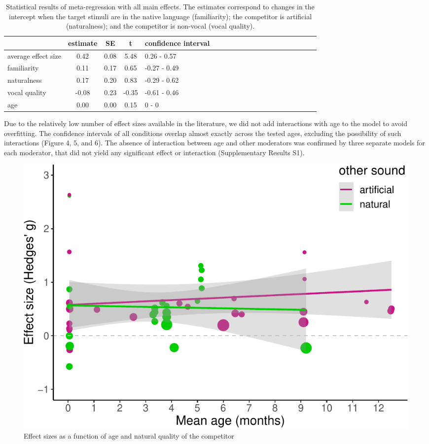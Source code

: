 \documentclass[man]{apa6}
\begin{document}
\begin{table}[tbp]
\begin{center}
\begin{threeparttable}
\caption{\label{tab:Table1}Statistical results of meta-regression with all main effects. The estimates correspond to changes in the intercept when the target stimuli are in the native language (familiarity); the competitor is artificial (naturalness); and the competitor is non-vocal (vocal quality).}
\begin{tabular}{lccclccclccclccclccc}
\toprule
 & estimate & SE & t & confidence interval\\
\midrule
average effect size & 0.42 & 0.08 & 5.48 & 0.26 - 0.57\\
familiarity & 0.11 & 0.17 & 0.65 & -0.27 - 0.49\\
naturalness & 0.17 & 0.20 & 0.83 & -0.29 - 0.62\\
vocal quality & -0.08 & 0.23 & -0.35 & -0.61 - 0.46\\
age & 0.00 & 0.00 & 0.15 & 0 - 0\\
\bottomrule
\end{tabular}
\end{threeparttable}
\end{center}
\end{table}

Due to the relatively low number of effect sizes available in the
literature, we did not add interactions with age to the model to avoid
overfitting. The confidence intervals of all conditions overlap almost
exactly across the tested ages, excluding the possibility of such
interactions (Figure 4, 5, and 6). The absence of interaction between
age and other moderators was confirmed by three separate models for each
moderator, that did not yield any significant effect or interaction
(Supplementary Results S1).

\begin{figure}
\centering
\includegraphics{MA_speech_pref_files/figure-latex/natural-1.pdf}
\caption{\label{fig:natural}Effect sizes as a function of age and natural
quality of the competitor}
\end{figure}
\end{document}
